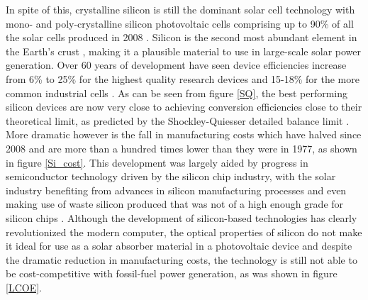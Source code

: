In spite of this, crystalline silicon is still the dominant solar cell technology with mono- and poly-crystalline silicon photovoltaic cells comprising up to 90\% of all the solar cells produced in 2008  \cite{Si_rev}. Silicon is the second most abundant element in the Earth's crust \cite{Si_abundance}, making it a plausible material to use in large-scale solar power generation. Over 60 years of development have seen device efficiencies increase from 6\% to 25\% for the highest quality research devices and 15-18\% for the more common industrial cells \cite{Si_rev}. As can be seen from figure \ref{SQ}, the best performing silicon devices are now very close to achieving conversion efficiencies close to their theoretical limit, as predicted by the Shockley-Quiesser detailed balance limit \cite{SQ_1961}. More dramatic however is the fall in manufacturing costs which have halved since 2008 and are more than a hundred times lower than they were in 1977, as shown in figure \ref{Si_cost}. This development was largely aided by progress in semiconductor technology driven by the silicon chip industry, with the solar industry benefiting from advances in silicon manufacturing processes and even making use of waste silicon produced that was not of a high enough grade for silicon chips \cite{PV_history1}. Although the development of silicon-based technologies has clearly revolutionized the modern computer, the optical properties of silicon do not make it ideal for use as a solar absorber material in a photovoltaic device and despite the dramatic reduction in manufacturing costs, the technology is still not able to be cost-competitive with fossil-fuel power generation, as was shown in figure \ref{LCOE}.\\

